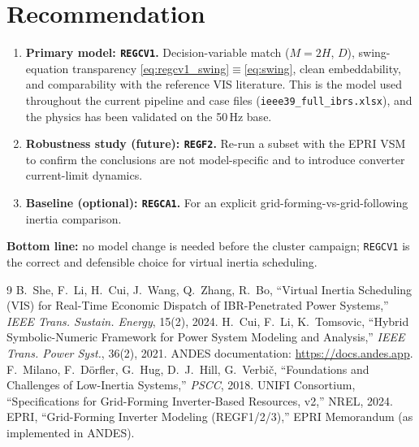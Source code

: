 \documentclass[11pt,a4paper]{article}
\newcommand{\model}[1]{\texttt{#1}}
\begin{document}
\section{Recommendation}
\begin{enumerate}[nosep]
\item \textbf{Primary model: \model{REGCV1}.} Decision-variable match ($M{=}2H$,
$D$), swing-equation transparency \eqref{eq:regcv1_swing}$\equiv$\eqref{eq:swing},
clean embeddability, and comparability with the reference VIS literature. This is
the model used throughout the current pipeline and case files
(\texttt{ieee39\_full\_ibrs.xlsx}), and the physics has been validated on the 50\,Hz
base.
\item \textbf{Robustness study (future): \model{REGF2}.} Re-run a subset with the
EPRI VSM to confirm the conclusions are not model-specific and to introduce
converter current-limit dynamics.
\item \textbf{Baseline (optional): \model{REGCA1}.} For an explicit
grid-forming-vs-grid-following inertia comparison.
\end{enumerate}
\textbf{Bottom line:} no model change is needed before the cluster campaign;
\model{REGCV1} is the correct and defensible choice for virtual inertia
scheduling.

\begin{thebibliography}{9}
\small
{} B.~She, F.~Li, H.~Cui, J.~Wang, Q.~Zhang, R.~Bo,
``Virtual Inertia Scheduling (VIS) for Real-Time Economic Dispatch of
IBR-Penetrated Power Systems,'' \emph{IEEE Trans. Sustain. Energy}, 15(2), 2024.
 H.~Cui, F.~Li, K.~Tomsovic, ``Hybrid Symbolic-Numeric Framework
for Power System Modeling and Analysis,'' \emph{IEEE Trans. Power Syst.}, 36(2),
2021. ANDES documentation: \url{https://docs.andes.app}.
 F.~Milano, F.~D\"orfler, G.~Hug, D.~J.~Hill, G.~Verbi\v{c},
``Foundations and Challenges of Low-Inertia Systems,'' \emph{PSCC}, 2018.
 UNIFI Consortium, ``Specifications for Grid-Forming Inverter-Based
Resources, v2,'' NREL, 2024.
 EPRI, ``Grid-Forming Inverter Modeling (REGF1/2/3),'' EPRI
Memorandum (as implemented in ANDES).
\end{thebibliography}
\end{document}
